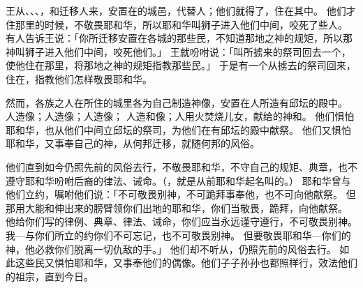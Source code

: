 {\par }{\PP {}王从{}、{}、{}、{}，和{}迁移人来，安置在{}的城邑，代替{}人；他们就得了{}，住在其中。
他们才住那里的时候，不敬畏耶和华，所以耶和华叫狮子进入他们中间，咬死了些人。
有人告诉{}王说：「你所迁移安置在{}各城的那些民，不知道那地之神的规矩，所以那神叫狮子进入他们中间，咬死他们。」
王就吩咐说：「叫所掳来的祭司回去一个，使他住在那里，将那地之神的规矩指教那些民。」
于是有一个从{}掳去的祭司回来，住在{}，指教他们怎样敬畏耶和华。
\par }{\PP {}然而，各族之人在所住的城里各为自己制造神像，安置在{}人所造有邱坛的殿中。
人造{}像；{}人造{}像；{}人造{}像；
人造{}和{}像；{}人用火焚烧儿女，献给{}的神{}和{}。
他们惧怕耶和华，也从他们中间立邱坛的祭司，为他们在有邱坛的殿中献祭。
他们又惧怕耶和华，又事奉自己的神，从何邦迁移，就随何邦的风俗。
\par }{\PP {}他们直到如今仍照先前的风俗去行，不{}敬畏耶和华，不{}守自己的规矩、典章，也不遵守耶和华吩咐{}后裔的律法、诫命。（{}，就是从前耶和华起名叫{}的。）
耶和华曾与他们立约，嘱咐他们说：「不可敬畏别神，不可跪拜事奉他，也不可向他献祭。
但那用大能和伸出来的膀臂领你们出{}地的耶和华，你们当敬畏，跪拜，向他献祭。
他给你们写的律例、典章、律法、诫命，你们应当永远谨守遵行，不可敬畏别神。
我—{}与你们所立的约你们不可忘记，也不可敬畏别神。
但要敬畏耶和华—你们的　神，他必救你们脱离一切仇敌的手。」
他们却不听从，仍照先前的风俗去行。
如此这些民又惧怕耶和华，又事奉他们的偶像。他们子子孙孙也都照样行，效法他们的祖宗，直到今日。

}
